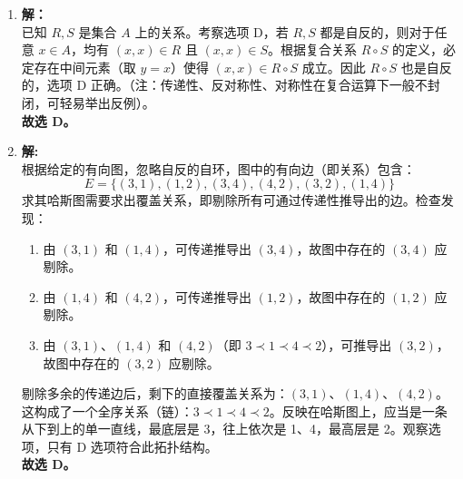 \begin{enumerate}
	\vspace{1em}
	
	\item \textbf{解：}\\
	已知 $R, S$ 是集合 $A$ 上的关系。考察选项 D，若 $R, S$ 都是自反的，则对于任意 $x \in A$，均有 $(x, x) \in R$ 且 $(x, x) \in S$。根据复合关系 $R \circ S$ 的定义，必定存在中间元素（取 $y = x$）使得 $(x, x) \in R \circ S$ 成立。因此 $R \circ S$ 也是自反的，选项 D 正确。（注：传递性、反对称性、对称性在复合运算下一般不封闭，可轻易举出反例）。\\
	\textbf{故选 D。}
	
	\vspace{1em}
	
	\item \textbf{解:}\\
	根据给定的有向图，忽略自反的自环，图中的有向边（即关系）包含：$$E = \{ (3,1), (1,2), (3,4), (4,2), (3,2), (1,4) \}$$求其哈斯图需要求出覆盖关系，即剔除所有可通过传递性推导出的边。检查发现：
	\begin{enumerate}
		\item 由 $(3,1)$ 和 $(1,4)$，可传递推导出 $(3,4)$，故图中存在的 $(3,4)$ 应剔除。\\
		\item 由 $(1,4)$ 和 $(4,2)$，可传递推导出 $(1,2)$，故图中存在的 $(1,2)$ 应剔除。\\
		\item 由 $(3,1)$、$(1,4)$ 和 $(4,2)$（即 $3 \prec 1 \prec 4 \prec 2$），可推导出 $(3,2)$，故图中存在的 $(3,2)$ 应剔除。\\
	\end{enumerate}
	剔除多余的传递边后，剩下的直接覆盖关系为：$(3,1)$、$(1,4)$、$(4,2)$。这构成了一个全序关系（链）：$3 \prec 1 \prec 4 \prec 2$。反映在哈斯图上，应当是一条从下到上的单一直线，最底层是 3，往上依次是 1、4，最高层是 2。观察选项，只有 D 选项符合此拓扑结构。\\
	\textbf{故选 D。}
	

\end{enumerate}
